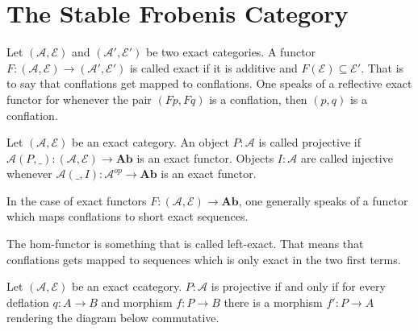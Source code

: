 \section{The Stable Frobenis Category}

    \begin{definition}
        Let $(\mathcal{A},\mathcal{E})$ and $(\mathcal{A}',\mathcal{E}')$ be two exact categories. A functor $F:(\mathcal{A},\mathcal{E})\rightarrow (\mathcal{A}',\mathcal{E}')$ is called exact if it is additive and $F(\mathcal{E})\subseteq \mathcal{E}'$. That is to say that conflations get mapped to conflations. One speaks of a reflective exact functor for whenever the pair $(Fp,Fq)$ is a conflation, then $(p,q)$ is a conflation.
    \end{definition}

    \begin{definition}
        Let $(\mathcal{A},\mathcal{E})$ be an exact category. An object $P:\mathcal{A}$ is called projective if $\mathcal{A}(P,\_):(\mathcal{A},\mathcal{E})\rightarrow \textbf{Ab}$ is an exact functor. Objects $I:\mathcal{A}$ are called injective whenever $\mathcal{A}(\_,I):\mathcal{A}^{op}\rightarrow\textbf{Ab}$ is an exact functor.
    \end{definition}

    \begin{remark}
        In the case of exact functors $F:(\mathcal{A},\mathcal{E})\rightarrow\textbf{Ab}$, one generally speaks of a functor which maps conflations to short exact sequences.
    \end{remark}

    \begin{remark}
        The hom-functor is something that is called left-exact. That means that conflations gets mapped to sequences which is only exact in the two first terms.
    \end{remark}

    \begin{prop}
        Let $(\mathcal{A},\mathcal{E})$ be an exact ccategory. $P:\mathcal{A}$ is projective if and only if for every deflation $q:A\rightarrow B$ and morphism $f:P\rightarrow B$  there is a morphism $f':P\rightarrow A$ rendering the diagram below commutative.
        \begin{center}
        \end{center}
    \end{prop}


